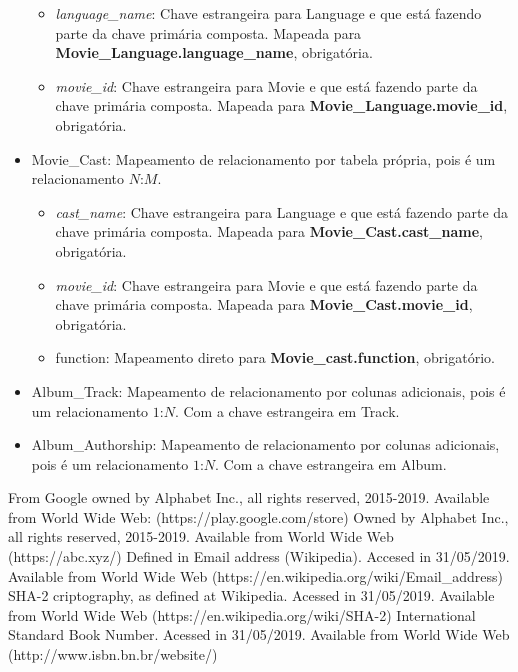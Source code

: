 \documentclass[a4paper, 11pt]{article}
\begin{document}
\begin{itemize}
\begin{itemize}
        \item {\textit{language\_name}}: Chave estrangeira para Language e que está fazendo parte da chave primária composta. Mapeada para {\textbf{Movie\_Language.language\_name}}, obrigatória.
        \item {\textit{movie\_id}}: Chave estrangeira para Movie e que está fazendo parte da chave primária composta. Mapeada para {\textbf{Movie\_Language.movie\_id}}, obrigatória.
    \end{itemize}
    \item Movie\_Cast: Mapeamento de relacionamento por tabela própria, pois é um relacionamento $N$:$M$.
    \begin{itemize}
        \item {\textit{cast\_name}}: Chave estrangeira para Language e que está fazendo parte da chave primária composta. Mapeada para {\textbf{Movie\_Cast.cast\_name}}, obrigatória.
        \item {\textit{movie\_id}}: Chave estrangeira para Movie e que está fazendo parte da chave primária composta. Mapeada para {\textbf{Movie\_Cast.movie\_id}}, obrigatória.
        \item function: Mapeamento direto para  {\textbf{Movie\_cast.function}}, obrigatório.
    \end{itemize}
    \item Album\_Track: Mapeamento de relacionamento por colunas adicionais, pois é um relacionamento $1$:$N$. Com a chave estrangeira em Track.
    \item Album\_Authorship: Mapeamento de relacionamento por colunas adicionais, pois é um relacionamento $1$:$N$. Com a chave estrangeira em Album.
    
        
\end{itemize}

\newpage
\newpage
\begin{thebibliography}{9}
 From Google owned by Alphabet Inc., all rights reserved, 2015-2019. Available from World Wide Web: (https://play.google.com/store)
 Owned by Alphabet Inc., all rights reserved, 2015-2019. Available from World Wide Web (https://abc.xyz/)
 Defined in Email address (Wikipedia). Accesed in 31/05/2019. Available from World Wide Web (https://en.wikipedia.org/wiki/Email\_address)
 SHA-2 criptography, as defined at Wikipedia. Acessed in 31/05/2019. Available from World Wide Web (https://en.wikipedia.org/wiki/SHA-2)
 International Standard Book Number. Acessed in 31/05/2019. Available from World Wide Web (http://www.isbn.bn.br/website/) 
\end{thebibliography}
\end{document}
